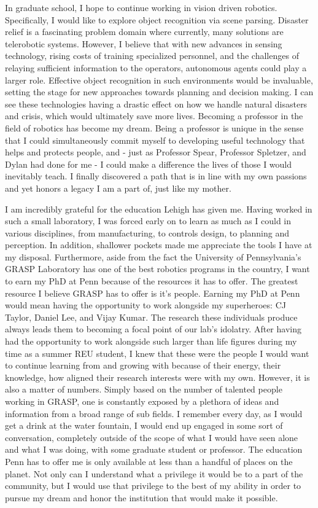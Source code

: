 \documentclass{article}
\begin{document}
In graduate school, I hope to continue working in vision driven robotics.
Specifically, I would like to explore object recognition via scene parsing.
Disaster relief is a fascinating problem domain where currently, many solutions
are telerobotic systems. However, I believe that with new advances in sensing
technology, rising costs of training specialized personnel, and the challenges
of relaying sufficient information to the operators, autonomous agents could
play a larger role. Effective object recognition in such environments would be
invaluable, setting the stage for new approaches towards planning and decision
making. I can see these technologies having a drastic effect on how we handle
natural disasters and crisis, which would ultimately save more lives. Becoming
a professor in the field of robotics has become my dream. Being a professor is
unique in the sense that I could simultaneously commit myself to developing
useful technology that helps and protects people, and - just as Professor
Spear, Professor Spletzer, and Dylan had done for me - I could make a
difference the lives of those I would inevitably teach. I finally discovered a
path that is in line with my own passions and yet honors a legacy I am a part
of, just like my mother.


I am incredibly grateful for the education Lehigh has given me. Having worked
in such a small laboratory, I was forced early on to learn as much as I could
in various disciplines, from manufacturing, to controls design, to planning and
perception. In addition, shallower pockets made me appreciate the tools I have
at my disposal. Furthermore, aside from the fact the University of
Pennsylvania’s GRASP Laboratory has one of the best robotics programs in the
country, I want to earn my PhD at Penn because of the resources it has to
offer. The greatest resource I believe GRASP has to offer is it's people.
Earning my PhD at Penn would mean having the opportunity to work alongside my
superheroes: CJ Taylor, Daniel Lee, and Vijay Kumar. The research these
individuals produce always leads them to becoming a focal point of our lab's
idolatry. After having had the opportunity to work alongside such larger than
life figures during my time as a summer REU student, I knew that these were the
people I would want to continue learning from and growing with because of their
energy, their knowledge, how aligned their research interests were with my own.
However, it is also a matter of numbers. Simply based on the number of talented
people working in GRASP, one is constantly exposed by a plethora of ideas and
information from a broad range of sub fields.  I remember every day, as I would
get a drink at the water fountain,  I would end up engaged in some sort of
conversation, completely outside of the scope of what I would have seen alone
and what I was doing, with some graduate student or professor. The education
Penn has to offer me is only available at less than a handful of places on the
planet. Not only can I understand what a privilege it would be to a part of the
community, but I would use that privilege to the best of my ability in order to
pursue my dream and honor the institution that would make it possible.
\end{document}
